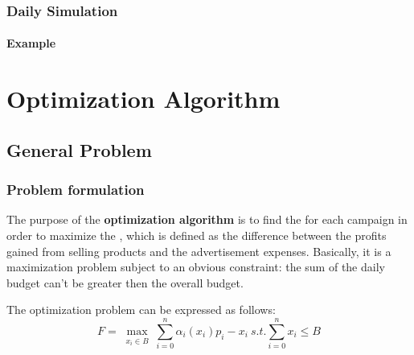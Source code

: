 \documentclass[11pt]{beamer}
\begin{document}

\begin{frame}

\frametitle{Daily Simulation}
\framesubtitle{Example}


\end{frame}


\AtBeginSection[]
{
\begin{frame}{}
    \tableofcontents[sections={\thesection}]
\end{frame}
}


\section{Optimization Algorithm}


\subsection{General Problem}


\begin{frame}

\frametitle{Problem formulation}

The purpose of the \textbf{optimization algorithm} is to find the  for each campaign in order to maximize the , which is defined as the difference between the profits gained from selling products and the advertisement expenses.
Basically, it is a maximization problem subject to an obvious constraint: the sum of the daily budget can't be greater then the overall budget.

The optimization problem can be expressed as follows:
\begin{displaymath}
F=\max_{\substack{x_i\in B}} \sum_{i=0}^n \alpha_i(x_i)p_i-x_i \ s.t. \sum_{i=0}^n x_i\leq B
\end{displaymath}

\end{frame}

\end{document}
